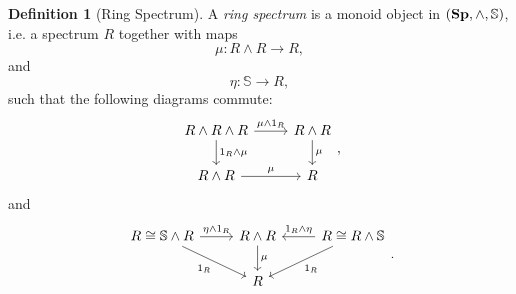 \documentclass[a4paper,english,11pt]{article}
\theoremstyle{definition}
\newtheorem{Def}{Definition}
\theoremstyle{plain}
\theoremstyle{remark}
\newcommand{\Sp}{\textbf{\text{Sp}}}
\begin{document}
\begin{Def}[Ring Spectrum]
  A \textit{ring spectrum} is a monoid object in \((\Sp,\wedge, \mathbb{S})\), i.e. a spectrum \(R\) together with maps
  \[\mu:R\wedge R\to R,\]
  and
  \[\eta:\mathbb{S}\to R,\]
  such that the following diagrams commute:
  \begin{equation*}
    \begin{tikzcd}
      R\wedge R\wedge R\arrow{r}{\mu\wedge 1_R}\arrow{d}{1_R\wedge \mu}& R\wedge R\arrow{d}{\mu}\\
      R\wedge R\arrow{r}{\mu}& R
    \end{tikzcd},
  \end{equation*}
  and
  \begin{equation*}
    \begin{tikzcd}
      R\cong \mathbb{S}\wedge R\arrow{r}{\eta\wedge 1_R}\arrow{dr}[swap]{1_R}& R\wedge R\arrow{d}{\mu}&R\cong R\wedge \mathbb{S}\arrow{l}[swap]{1_R\wedge \eta}\arrow{dl}{1_R}\\
      &R&
    \end{tikzcd}.
  \end{equation*}

\end{Def}
\end{document}
